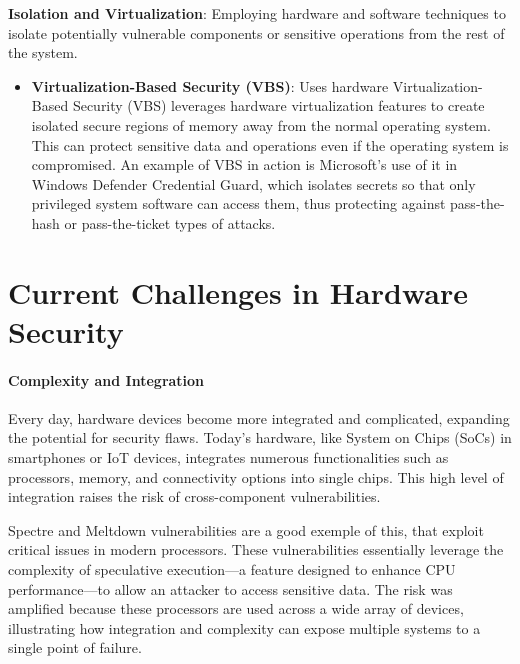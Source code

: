 \textbf{Isolation and Virtualization}: Employing hardware and software
techniques to isolate potentially vulnerable components or sensitive
operations from the rest of the system.

\begin{itemize}
\item
  \textbf{Virtualization-Based Security (VBS)}: Uses hardware
  Virtualization-Based Security (VBS) leverages hardware virtualization features to create isolated secure regions of memory away from the normal operating system. This can protect sensitive data and operations even if the operating system is compromised. An example of VBS in action is Microsoft's use of it in Windows Defender Credential Guard, which isolates secrets so that only privileged system software can access them, thus protecting against pass-the-hash or pass-the-ticket types of attacks.\cite{vinaypamnani-msftWindowsDefenderApplication2024}
\end{itemize}

\hypertarget{current-challenges-in-hardware-security}{%
\section{Current Challenges in Hardware
Security}\label{current-challenges-in-hardware-security}}

\hypertarget{complexity-and-integration}{%
\paragraph{Complexity and
Integration}\label{complexity-and-integration}}

Every day, hardware devices become more integrated and complicated, expanding the potential for security flaws. Today's hardware, like System on Chips (SoCs) in smartphones or IoT devices, integrates numerous functionalities such as processors, memory, and connectivity options into single chips. This high level of integration raises the risk of cross-component vulnerabilities.

Spectre and Meltdown vulnerabilities are a good exemple of this, that exploit critical issues in modern processors. These vulnerabilities essentially leverage the complexity of speculative execution—a feature designed to enhance CPU performance—to allow an attacker to access sensitive data. The risk was amplified because these processors are used across a wide array of devices, illustrating how integration and complexity can expose multiple systems to a single point of failure.\cite{kocherSpectreAttacksExploiting2018}

